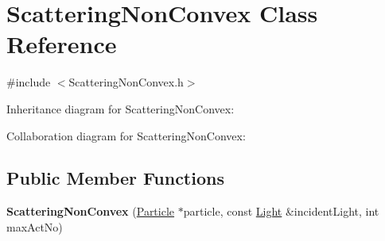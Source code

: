 \hypertarget{class_scattering_non_convex}{}\section{Scattering\+Non\+Convex Class Reference}
\label{class_scattering_non_convex}


{\ttfamily \#include $<$Scattering\+Non\+Convex.\+h$>$}



Inheritance diagram for Scattering\+Non\+Convex\+:


Collaboration diagram for Scattering\+Non\+Convex\+:
\subsection*{Public Member Functions}
\begin{DoxyCompactItemize}
\item 
\mbox{\label{class_scattering_non_convex_adad46e80a1c7fc4627201bb82791b1ae}} 
{\bfseries Scattering\+Non\+Convex} (\mbox{\hyperlink{class_particle}{Particle}} $\ast$particle, const \mbox{\hyperlink{class_light}{Light}} \&incident\+Light, int max\+Act\+No)
\end{DoxyCompactItemize}
